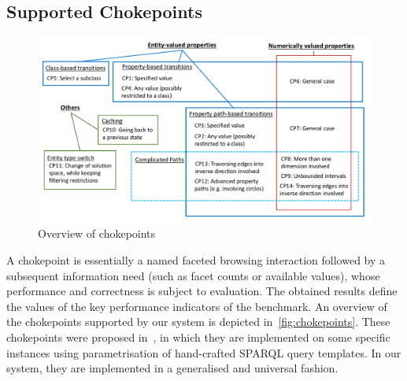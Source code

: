 \subsection{Supported Chokepoints}
\begin{figure}
\centering
\includegraphics[width=\textwidth]{images/cps}
\caption{Overview of chokepoints}
\label{fig:chokepoints}
\end{figure}

A chokepoint is essentially a named faceted browsing interaction followed by a subsequent information need (such as facet counts or available values), whose performance and correctness
is subject to evaluation. The obtained results define
the values of the key performance indicators of the benchmark.
An overview of the chokepoints supported by our system is depicted in~\autoref{fig:chokepoints}.
These chokepoints were proposed in~\cite{petzka}, in which they are implemented on some specific instances using parametrisation of hand-crafted SPARQL query templates. In our system, they are implemented in a generalised and universal fashion.


